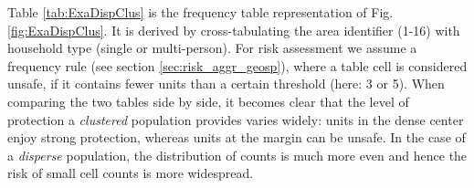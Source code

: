 
Table \ref{tab:ExaDispClus} is the frequency table representation of Fig. \ref{fig:ExaDispClus}. It is derived by cross-tabulating the area identifier (1-16) with household type (single or multi-person). For risk assessment we assume a frequency rule (see section \ref{sec:risk_aggr_geosp}), where a table cell is considered unsafe, if it contains fewer units than a certain threshold (here: 3 or 5). 
When comparing the two tables side by side, it becomes clear that the level of protection a \emph{clustered} population provides varies widely: units in the dense center enjoy strong protection, whereas units at the margin can be unsafe. 
In the case of a \emph{disperse} population, the distribution of counts is much more even and hence the risk of small cell counts is more widespread.

